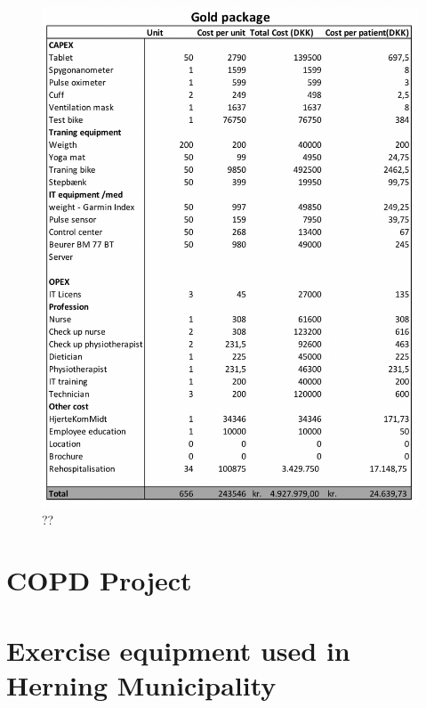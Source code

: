 \begin{figure}[H]
\centering
\includegraphics[width=1\textwidth]{Figure/Gold.png}
\caption{??}
\label{fig: Gold}
\end{figure} 


\chapter{COPD Project}

\chapter{Exercise equipment used in Herning Municipality}

 
